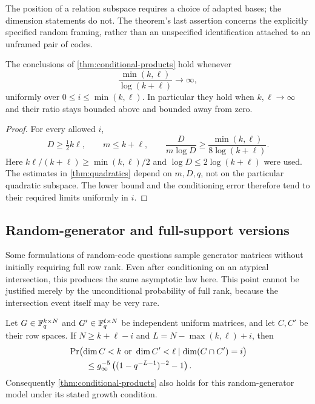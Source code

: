 The position of a relation subspace requires a choice of adapted bases;
the dimension statements do not.  The theorem's last assertion concerns
the explicitly specified random framing, rather than an unspecified
identification attached to an unframed pair of codes.

\begin{corollary}
\label{cor:product-range}
The conclusions of \cref{thm:conditional-products} hold whenever
\begin{equation}\label{eq:simple-product-growth}
 \frac{\min(k,\ell)}{\log(k+\ell)}\longrightarrow\infty,
\end{equation}
uniformly over $0\le i\le\min(k,\ell)$.  In particular they hold when
$k,\ell\to\infty$ and their ratio stays bounded above and bounded
away from zero.
\end{corollary}

\begin{proof}
For every allowed $i$,
\[
 D\ge\tfrac12 k\ell,\qquad m\le k+\ell,\qquad
 \frac{D}{m\log D}
 \ge\frac{\min(k,\ell)}{8\log(k+\ell)}.
\]
Here $k\ell/(k+\ell)\ge\min(k,\ell)/2$ and
$\log D\le2\log(k+\ell)$ were used.  The estimates in
\cref{thm:quadratics} depend on $m,D,q$, not on the particular quadratic
subspace.  The lower bound and the conditioning error therefore tend
to their required limits uniformly in $i$.
\end{proof}

\subsection{Random-generator and full-support versions}

Some formulations of random-code questions sample generator matrices
without initially requiring full row rank.  Even after conditioning on
an atypical intersection, this produces the same asymptotic law here.
This point cannot be justified merely by the unconditional probability
of full rank, because the intersection event itself may be very rare.

\begin{proposition}
\label{prop:generator-conditioning}
Let $G\in\mathbb F_q^{k\times N}$ and $G'\in\mathbb F_q^{\ell\times N}$ be independent
uniform matrices, and let $C,C'$ be their row spaces.  If
$N\ge k+\ell-i$ and $L=N-\max(k,\ell)+i$, then
\begin{align}
 &\Pr\bigl(\dim C<k\text{ or }\dim C'<\ell
       \mid\dim(C\cap C')=i\bigr)\notag\\
 &\qquad\le g_\infty^{-5}
       \left((1-q^{-L-1})^{-2}-1\right).
       \label{eq:conditional-generator-error}
\end{align}
Consequently \cref{thm:conditional-products} also holds for this
random-generator model under its stated growth condition.
\end{proposition}

